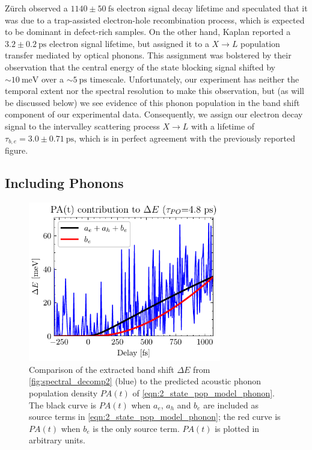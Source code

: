 Z\"{u}rch observed a $1140 \pm 50 \ \textrm{fs}$ electron signal decay lifetime and speculated that it was due to a trap-assisted electron-hole recombination process, which is expected to be dominant in defect-rich samples. On the other hand, Kaplan reported a $3.2 \pm 0.2 \ \textrm{ps}$ electron signal lifetime, but assigned it to a $X \rightarrow L$ population transfer mediated by optical phonons. This assignment was bolstered by their observation that the central energy of the state blocking signal shifted by $\sim 10 \ \textrm{meV}$ over a $\sim 5 \ \textrm{ps}$ timescale. Unfortunately, our experiment has neither the temporal extent nor the spectral resolution to make this observation, but (as will be discussed below) we see evidence of this phonon population in the band shift component of our experimental data. Consequently, we assign our electron decay signal to the intervalley scattering process $X \rightarrow L$ with a lifetime of $\tau_{b,e} = 3.0 \pm 0.71 \ \textrm{ps}$, which is in perfect agreement with the previously reported figure.

\subsection{Including Phonons}
\label{sec:phonon_model}

\begin{figure}
	\centering
	\includegraphics[width=0.75\textwidth]{figures/chap4/DeltaE_PA_vs_t.pdf}
	\caption{Comparison of the extracted band shift $\Delta E$ from \cref{fig:spectral_decomp2} (blue) to the predicted acoustic phonon population density $PA(t)$ of \cref{eqn:2_state_pop_model_phonon}. The black curve is $PA(t)$ when $a_e$, $a_h$ and $b_e$ are included as source terms in \cref{eqn:2_state_pop_model_phonon}; the red curve is $PA(t)$ when $b_e$ is the only source term. $PA(t)$ is plotted in arbitrary units.}
	\label{fig:DeltaE_PA_vs_t}
\end{figure}

